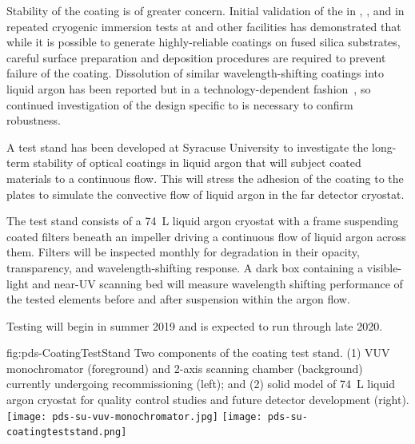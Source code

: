 Stability of the  coating is of greater concern.  Initial validation of the  in , , and in repeated cryogenic immersion tests at  and other facilities has demonstrated that while it is possible to generate highly-reliable  coatings on fused silica substrates, careful surface preparation and deposition procedures are required to prevent failure of the coating.  
Dissolution of similar wavelength-shifting coatings into liquid argon has been reported but in a technology-dependent fashion~\cite{Asaadi:2018ixs}, so continued investigation of the design specific to  is necessary to confirm robustness. 


A test stand has been developed at Syracuse University to investigate the long-term stability of  optical coatings in liquid argon that will
subject coated materials to a continuous flow. This will stress the adhesion of the coating to the plates to simulate the convective flow of liquid argon in the far detector cryostat.
 
The test stand consists of a \SI{74}{L} liquid argon cryostat with a frame suspending coated filters beneath an impeller driving a continuous flow of liquid argon across them. Filters will be inspected monthly for degradation in their opacity, transparency, and wavelength-shifting response. A dark box containing a visible-light and near-UV scanning bed will measure wavelength shifting performance of the tested elements before and after suspension within the argon flow.

Testing will begin in summer 2019 and is expected to run through late 2020.


\begin{dunefigure}
 {fig:pds-CoatingTestStand}
 {Two components of the  coating test stand. (1) VUV monochromator (foreground) and 2-axis scanning chamber (background) 
 currently undergoing recommissioning (left); and (2) solid model of \SI{74}{L} liquid argon cryostat for quality control studies and future detector development (right).}
\texttt{[image: pds-su-vuv-monochromator.jpg]}
\hspace{0.02\textwidth}
\texttt{[image: pds-su-coatingteststand.png]}
\end{dunefigure}



